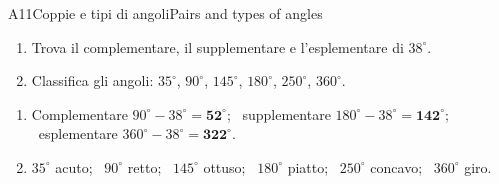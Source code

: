 
\begin{esercizio}{A1}{1}{Coppie e tipi di angoli}{Pairs and types of angles}
\begin{enumerate}
\item Trova il complementare, il supplementare e l'esplementare di $38^\circ$.
\item Classifica gli angoli: $35^\circ$, $90^\circ$, $145^\circ$, $180^\circ$, $250^\circ$, $360^\circ$.
\end{enumerate}
\end{esercizio}
\begin{solbox}
\begin{enumerate}
\item Complementare $90^\circ-38^\circ=\mathbf{52^\circ}$; \ supplementare $180^\circ-38^\circ=\mathbf{142^\circ}$; \ esplementare $360^\circ-38^\circ=\mathbf{322^\circ}$.
\item $35^\circ$ acuto; \ $90^\circ$ retto; \ $145^\circ$ ottuso; \ $180^\circ$ piatto; \ $250^\circ$ concavo; \ $360^\circ$ giro.
\end{enumerate}
\end{solbox}

